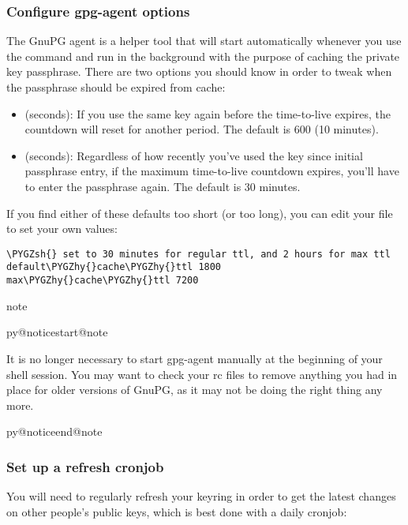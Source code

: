 \documentclass[a4paper,8pt,english]{sphinxmanual}
\makeatletter
\renewenvironment{notice}[2]{%
          \def\py@noticetype{#1}
          \begin{coloredbox}{#1}
          \bf\it
          \par\strong{#2}
          \csname py@noticestart@#1\endcsname
        }
	{
          \csname py@noticeend@\py@noticetype\endcsname
          \end{coloredbox}
        }
\def\PYGZsh{\char`\#}
\def\PYGZhy{\char`\-}
\makeatother
\begin{document}
\subsubsection{Configure gpg-agent options}
\label{process/maintainer-pgp-guide:configure-gpg-agent-options}
The GnuPG agent is a helper tool that will start automatically whenever
you use the  command and run in the background with the purpose
of caching the private key passphrase. There are two options you should
know in order to tweak when the passphrase should be expired from cache:
\begin{itemize}
\item {} 
 (seconds): If you use the same key again before
the time-to-live expires, the countdown will reset for another period.
The default is 600 (10 minutes).

\item {} 
 (seconds): Regardless of how recently you've used
the key since initial passphrase entry, if the maximum time-to-live
countdown expires, you'll have to enter the passphrase again. The
default is 30 minutes.

\end{itemize}

If you find either of these defaults too short (or too long), you can
edit your  file to set your own values:

\begin{Verbatim}[commandchars=\\\{\}]
\PYGZsh{} set to 30 minutes for regular ttl, and 2 hours for max ttl
default\PYGZhy{}cache\PYGZhy{}ttl 1800
max\PYGZhy{}cache\PYGZhy{}ttl 7200
\end{Verbatim}

\begin{notice}{note}{Note:}
It is no longer necessary to start gpg-agent manually at the
beginning of your shell session. You may want to check your rc files
to remove anything you had in place for older versions of GnuPG, as
it may not be doing the right thing any more.
\end{notice}


\subsubsection{Set up a refresh cronjob}
\label{process/maintainer-pgp-guide:set-up-a-refresh-cronjob}
You will need to regularly refresh your keyring in order to get the
latest changes on other people's public keys, which is best done with a
daily cronjob:
\end{document}
